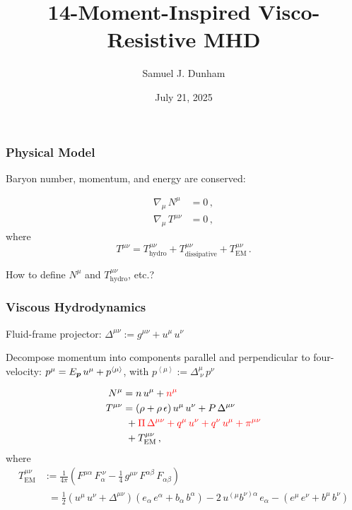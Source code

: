 \documentclass{beamer}
\title[SXS Group Meeting]{14-Moment-Inspired Visco-Resistive MHD}
\author{Samuel J. Dunham}
\date{July 21, 2025}
\begin{document}
\begin{frame}

  \maketitle

\end{frame}

\begin{frame}
\frametitle{Physical Model}

  Baryon number, momentum, and energy are conserved:

  \begin{align}
    \nabla_{\mu} \, N^{\mu} &= 0 \, , \\
    \nabla_{\mu} \, T^{\mu\nu} &= 0 \, ,
  \end{align}
  where
  \begin{equation}
    T^{\mu\nu} = T^{\mu\nu}_{\mathrm{hydro}}
    + T^{\mu\nu}_{\mathrm{dissipative}} + T^{\mu\nu}_{\mathrm{EM}} \, .
  \end{equation}

  How to define $N^{\mu}$ and $T^{\mu\nu}_{\mathrm{hydro}}$, etc.?

\end{frame}

\begin{frame}
\frametitle{Viscous Hydrodynamics}

  Fluid-frame projector: $\Delta^{\mu\nu} := g^{\mu\nu} + u^{\mu} \, u^{\nu}$ \newline

  Decompose momentum into components parallel and perpendicular to four-velocity:
  $p^{\mu} = E_{\boldsymbol{p}} \, u^{\mu} + p^{\left<\mu\right>}$, with
  $p^{\left<\mu\right>} := \Delta^{\mu}_{~\nu} \, p^{\nu}$

  \begin{align}
    N^{\mu} &= n \, u^{\mu} + \textcolor{red}{n^{\mu}} \\
    T^{\mu\nu} &= \left( \rho + \rho \, \epsilon \right)
    u^{\mu} \, u^{\nu} + P \, \Delta^{\mu\nu} \notag \\
    &\ + \textcolor{red}{\Pi \, \Delta^{\mu\nu}
    + q^{\mu} \, u^{\nu} + q^{\nu} \, u^{\mu} + \pi^{\mu\nu}} \notag \\
    &\ + T^{\mu\nu}_{\mathrm{EM}} \, ,
  \end{align}
  where
  \begin{align}
    T^{\mu\nu}_{\mathrm{EM}}
    &:= \frac{1}{4\pi} \left( F^{\mu\alpha} \, F_{\alpha}^{~\nu}
    - \frac{1}{4} \, g^{\mu\nu} \, F^{\alpha\beta} \, F_{\alpha\beta} \right) \\
    &\phantom{:}= \frac{1}{2} \left( u^{\mu} \, u^{\nu} + \Delta^{\mu\nu} \right)
    \left( e_{\alpha} \, e^{\alpha} + b_{\alpha} \, b^{\alpha} \right)
    - 2 \, u^{\left(\mu\right.}b^{\left.\nu\right)\alpha} \, e_{\alpha}
    - \left( e^{\mu} \, e^{\nu} + b^{\mu} \, b^{\nu} \right)
  \end{align}

\end{frame}
\end{document}
